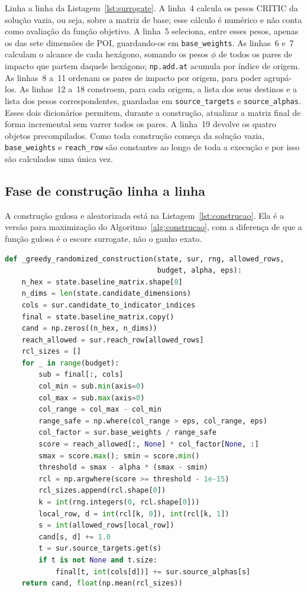 \documentclass[11pt,a4paper]{article}
\newcommand{\code}[1]{\texttt{#1}}
\begin{document}
Linha a linha da Listagem~\ref{lst:surrogate}. A linha~4 calcula os pesos CRITIC da solução vazia, ou seja, sobre a matriz de base; esse cálculo é numérico e não conta como avaliação da função objetivo. A linha~5 seleciona, entre esses pesos, apenas os das sete dimensões de POI, guardando-os em \code{base\_weights}. As linhas~6 e~7 calculam o alcance de cada hexágono, somando os pesos $\phi$ de todos os pares de impacto que partem daquele hexágono; \code{np.add.at} acumula por índice de origem. As linhas~8 a~11 ordenam os pares de impacto por origem, para poder agrupá-los. As linhas~12 a~18 constroem, para cada origem, a lista dos seus destinos e a lista dos pesos correspondentes, guardadas em \code{source\_targets} e \code{source\_alphas}. Esses dois dicionários permitem, durante a construção, atualizar a matriz final de forma incremental sem varrer todos os pares. A linha~19 devolve os quatro objetos precompilados. Como toda construção começa da solução vazia, \code{base\_weights} e \code{reach\_row} são constantes ao longo de toda a execução e por isso são calculados uma única vez.

\subsection{Fase de construção linha a linha}

A construção gulosa e aleatorizada está na Listagem~\ref{lst:construcao}. Ela é a versão para maximização do Algoritmo~\ref{alg:construcao}, com a diferença de que a função gulosa é o escore surrogate, não o ganho exato.

\begin{lstlisting}[language=Python,caption={Construção gulosa e aleatorizada com escore surrogate.},label={lst:construcao}]
def _greedy_randomized_construction(state, sur, rng, allowed_rows,
                                    budget, alpha, eps):
    n_hex = state.baseline_matrix.shape[0]
    n_dims = len(state.candidate_dimensions)
    cols = sur.candidate_to_indicator_indices
    final = state.baseline_matrix.copy()
    cand = np.zeros((n_hex, n_dims))
    reach_allowed = sur.reach_row[allowed_rows]
    rcl_sizes = []
    for _ in range(budget):
        sub = final[:, cols]
        col_min = sub.min(axis=0)
        col_max = sub.max(axis=0)
        col_range = col_max - col_min
        range_safe = np.where(col_range > eps, col_range, eps)
        col_factor = sur.base_weights / range_safe
        score = reach_allowed[:, None] * col_factor[None, :]
        smax = score.max(); smin = score.min()
        threshold = smax - alpha * (smax - smin)
        rcl = np.argwhere(score >= threshold - 1e-15)
        rcl_sizes.append(rcl.shape[0])
        k = int(rng.integers(0, rcl.shape[0]))
        local_row, d = int(rcl[k, 0]), int(rcl[k, 1])
        s = int(allowed_rows[local_row])
        cand[s, d] += 1.0
        t = sur.source_targets.get(s)
        if t is not None and t.size:
            final[t, int(cols[d])] += sur.source_alphas[s]
    return cand, float(np.mean(rcl_sizes))
\end{lstlisting}
\end{document}
